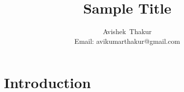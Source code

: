 \documentclass[12pt, journal, a4paper]{IEEEtran}
\begin{document}
\title{Sample Title}
\author{Avishek~Thakur\\%
Email: avikumarthakur@gmail.com
}

\twocolumn[
  \begin{@twocolumnfalse}
	\maketitle
	\begin{abstract}
	  \label{abstract}
	  
    \end{abstract}
    \tableofcontents
  \end{@twocolumnfalse}
  ]

\clearpage

\section{Introduction}
\label{intro}


\printbibliography
	
\end{document}

